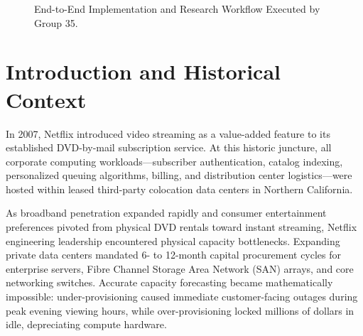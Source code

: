 \documentclass[11pt,a4paper]{article}
\begin{document}
\begin{figure}[htbp]
\centering
{}
\caption{End-to-End Implementation and Research Workflow Executed by Group 35.}
\label{fig:project_flow}
\end{figure}

\newpage

\section{Introduction and Historical Context}

In 2007, Netflix introduced video streaming as a value-added feature to its established DVD-by-mail subscription service. At this historic juncture, all corporate computing workloads---subscriber authentication, catalog indexing, personalized queuing algorithms, billing, and distribution center logistics---were hosted within leased third-party colocation data centers in Northern California. 

As broadband penetration expanded rapidly and consumer entertainment preferences pivoted from physical DVD rentals toward instant streaming, Netflix engineering leadership encountered physical capacity bottlenecks. Expanding private data centers mandated 6- to 12-month capital procurement cycles for enterprise servers, Fibre Channel Storage Area Network (SAN) arrays, and core networking switches. Accurate capacity forecasting became mathematically impossible: under-provisioning caused immediate customer-facing outages during peak evening viewing hours, while over-provisioning locked millions of dollars in idle, depreciating compute hardware.
\end{document}
